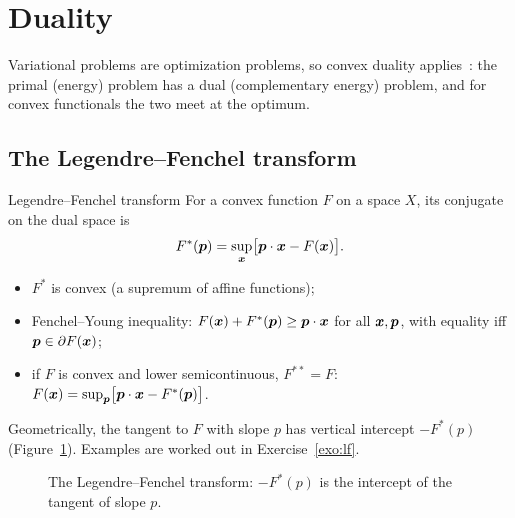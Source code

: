 \section{Duality}\label{sec:var-dual}
%
Variational problems are optimization problems, so convex duality
applies~\cite{EkelandTemam1999,Rockafellar1970}: the primal (energy) problem
has a dual (complementary energy) problem, and for convex functionals the two
meet at the optimum.
\begin{center}
\end{center}

\subsection{The Legendre--Fenchel transform}
\begin{gbox}{Legendre--Fenchel transform}
%
For a convex function $F$ on a space $X$, its conjugate on the dual space is
\[
  F^\ast(\bm{p})=\sup_{\bm{x}}\bigl[\bm{p}\cdot\bm{x}-F(\bm{x})\bigr].
\]
\begin{itemize}
  \item $F^\ast$ is convex (a supremum of affine functions);
  \item Fenchel--Young inequality: $F(\bm{x})+F^\ast(\bm{p})\ge\bm{p}\cdot\bm{x}$ for all
  $\bm{x},\bm{p}$, with equality iff $\bm{p}\in\partial F(\bm{x})$;
  \item if $F$ is convex and lower semicontinuous, $F^{\ast\ast}=F$:
  $F(\bm{x})=\sup_{\bm{p}}\bigl[\bm{p}\cdot\bm{x}-F^\ast(\bm{p})\bigr]$.
\end{itemize}
\end{gbox}
Geometrically, the tangent to $F$ with slope $p$ has vertical intercept
$-F^\ast(p)$ (Figure~\ref{fig:legendre}). Examples are worked out in
Exercise~\ref{exo:lf}.

\begin{figure}[h]
\centering
{}
\caption{The Legendre--Fenchel transform: $-F^\ast(p)$ is the intercept of
the tangent of slope $p$.}
\label{fig:legendre}
\end{figure}

